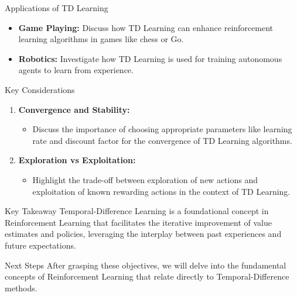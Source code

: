 \documentclass[aspectratio=169]{beamer}
\begin{document}
\begin{frame}[fragile]{Applications of TD Learning}
    \begin{itemize}
        \item \textbf{Game Playing:} Discuss how TD Learning can enhance reinforcement learning algorithms in games like chess or Go.
        \item \textbf{Robotics:} Investigate how TD Learning is used for training autonomous agents to learn from experience.
    \end{itemize}
\end{frame}

\begin{frame}[fragile]{Key Considerations}
    \begin{enumerate}
        \item \textbf{Convergence and Stability:} 
            \begin{itemize}
                \item Discuss the importance of choosing appropriate parameters like learning rate and discount factor for the convergence of TD Learning algorithms.
            \end{itemize}
        \item \textbf{Exploration vs Exploitation:}
            \begin{itemize}
                \item Highlight the trade-off between exploration of new actions and exploitation of known rewarding actions in the context of TD Learning.
            \end{itemize}
    \end{enumerate}
\end{frame}

\begin{frame}[fragile]{Key Takeaway}
    Temporal-Difference Learning is a foundational concept in Reinforcement Learning that facilitates the iterative improvement of value estimates and policies, leveraging the interplay between past experiences and future expectations.
\end{frame}

\begin{frame}[fragile]{Next Steps}
    After grasping these objectives, we will delve into the fundamental concepts of Reinforcement Learning that relate directly to Temporal-Difference methods.
\end{frame}
\end{document}
